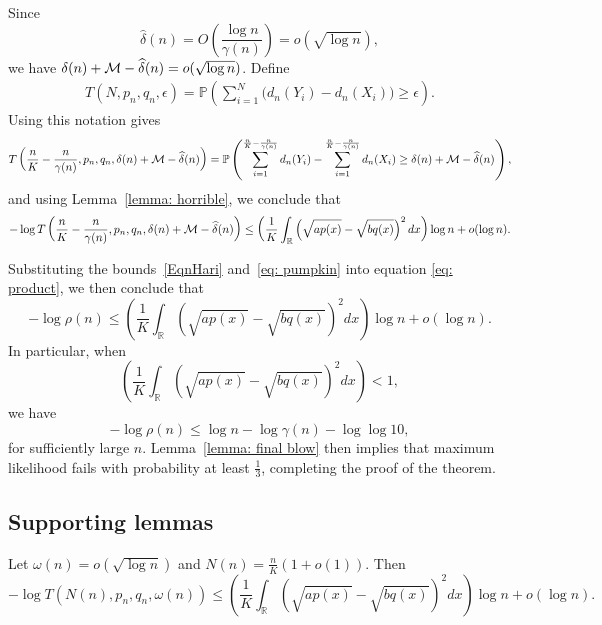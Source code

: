 Since $$\hat \delta(n)  = O\left(\frac{\log n}{\gamma(n)}\right) = o(\sqrt{\log n}),$$ 
we have $\delta(n) + {\mathcal{M}} - \widehat\delta(n) = o(\sqrt{\log n})$.
Define
\begin{align}
\label{EqnT}
T(N, p_n, q_n, \epsilon) = \mathbb P \left(\sum_{i=1}^N \Big(d_n(Y_i)-d_n(X_i)\Big) \ge \epsilon \right).
\end{align}
Using this notation gives 
\begin{equation*}
T\left(\frac{n}{K}-\frac{n}{\gamma(n)}, p_n, q_n, \delta(n) + {\mathcal{M}} -\widehat \delta(n)\right) = \mathbb P \left( \sum_{i=1}^{\frac{n}{K}-\frac{n}{\gamma(n)}} d_n(Y_i) - \sum_{i=1}^{\frac{n}{K}-\frac{n}{\gamma(n)}} d_n(X_i) \geq \delta(n) + {\mathcal{M}} - \widehat \delta(n) \right),
\end{equation*}
and using Lemma~\ref{lemma: horrible}, we conclude that
\begin{equation}\label{eq: pumpkin}
 -\log T\left(\frac{n}{K}-\frac{n}{\gamma(n)}, p_n, q_n, \delta(n) + {\mathcal{M}} -\widehat \delta(n)\right) \leq  \left(\frac{1}{K}\int_{\mathbb R}  \left(\sqrt{ap(x)} - \sqrt{bq(x)}\right)^2 dx\right)\log n + o(\log n).
\end{equation}

Substituting the bounds~\eqref{EqnHari} and~\eqref{eq: pumpkin} into equation \eqref{eq: product}, we then conclude that
\begin{equation*}
-\log \rho(n) \leq \left(\frac{1}{K}\int_{\mathbb R}  \left(\sqrt{ap(x)} - \sqrt{bq(x)}\right)^2 dx\right)\log n + o(\log n).
\end{equation*}
In particular, when
$$\left(\frac{1}{K}\int_{\mathbb R}  \left(\sqrt{ap(x)} - \sqrt{bq(x)}\right)^2 dx\right) < 1,$$
we have
$$-\log \rho(n) \leq \log n -\log \gamma(n) - \log\log 10,$$
for sufficiently large $n$. Lemma~\ref{lemma: final blow} then implies that maximum likelihood fails with probability at least $\frac{1}{3}$, completing the proof of the theorem.








\subsection{Supporting lemmas}
\label{sec:threshold_lemmas}


\begin{lemma} 
\label{lemma: horrible}
Let $\omega(n) = o(\sqrt{\log n})$ and $N(n) = \frac{n}{K}(1 + o(1))$. Then
$$-\log T\left(N(n), p_n, q_n, \omega(n)\right) \leq  \left(\frac{1}{K}\int_{\mathbb R}  \left(\sqrt{ap(x)} - \sqrt{bq(x)}\right)^2 dx\right) \log n + o(\log n).$$
\end{lemma}


